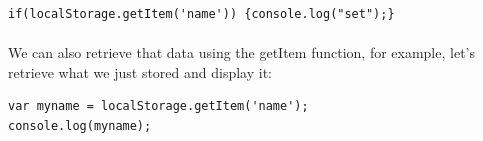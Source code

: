 \documentclass[10pt, a4paper, twosize]{article}
\begin{document}
\begin{lstlisting}
if(localStorage.getItem('name')) {console.log("set");}
\end{lstlisting}

\paragraph{} We can also retrieve that data using the getItem function, for example, let's retrieve what we just stored and display it:
\begin{lstlisting}
var myname = localStorage.getItem('name');
console.log(myname);
\end{lstlisting}
\paragraph{}
\end{document}
